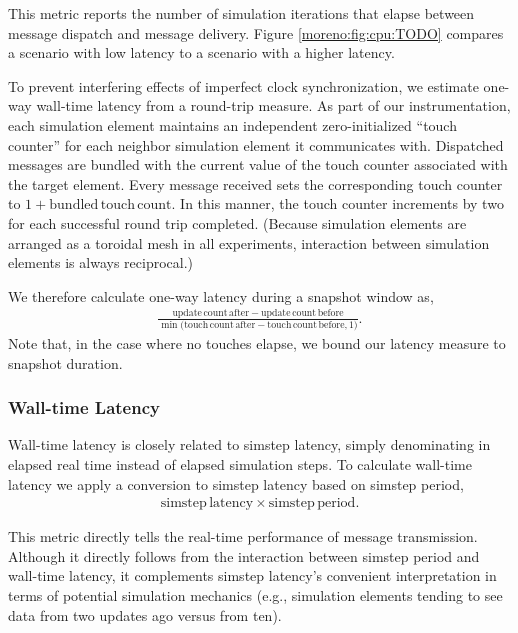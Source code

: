This metric reports the number of simulation iterations that elapse between message dispatch and message delivery.
Figure \ref{moreno:fig:cpu:TODO} compares a scenario with low latency to a scenario with a higher latency.

To prevent interfering effects of imperfect clock synchronization, we estimate one-way wall-time latency from a round-trip measure.
As part of our instrumentation, each simulation element maintains an independent zero-initialized ``touch counter'' for each neighbor simulation element it communicates with.
Dispatched messages are bundled with the current value of the touch counter associated with the target element.
Every message received sets the corresponding touch counter to $1 + \mathrm{bundled\,touch\,count}$.
In this manner, the touch counter increments by two for each successful round trip completed.
(Because simulation elements are arranged as a toroidal mesh in all experiments, interaction between simulation elements is always reciprocal.)

We therefore calculate one-way latency during a snapshot window as,
\begin{align*}
  \frac{
    \mathrm{update\,count\,after} - \mathrm{update\,count\,before}
  }{
    \min\Big( \mathrm{ touch\,count\,after } - \mathrm{ touch\,count\,before }, 1 \Big)
  }.
\end{align*}
Note that, in the case where no touches elapse, we bound our latency measure to snapshot duration.


\subsubsection{Wall-time Latency} \label{moreno:sec:simulation-time-latency-metric}

Wall-time latency is closely related to simstep latency, simply denominating in elapsed real time instead of elapsed simulation steps.
To calculate wall-time latency we apply a conversion to simstep latency based on simstep period,
\begin{align*}
  \mathrm{simstep\,latency} \times \mathrm{simstep\,period}.
\end{align*}

This metric directly tells the real-time performance of message transmission.
Although it directly follows from the interaction between simstep period and wall-time latency, it complements simstep latency's convenient interpretation in terms of potential simulation mechanics (e.g., simulation elements tending to see data from two updates ago versus from ten).

